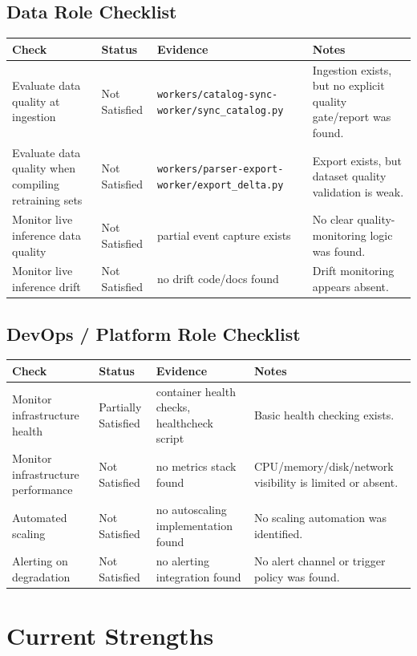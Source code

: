 \documentclass[11pt,a4paper]{article}
\begin{document}
\subsection{Data Role Checklist}

\begin{tabularx}{\textwidth}{P{4.2cm}P{2.4cm}P{3.8cm}Y}
\toprule
\textbf{Check} & \textbf{Status} & \textbf{Evidence} & \textbf{Notes} \\
\midrule
Evaluate data quality at ingestion & Not Satisfied & \texttt{workers/catalog-sync-worker/sync\_catalog.py} & Ingestion exists, but no explicit quality gate/report was found. \\
Evaluate data quality when compiling retraining sets & Not Satisfied & \texttt{workers/parser-export-worker/export\_delta.py} & Export exists, but dataset quality validation is weak. \\
Monitor live inference data quality & Not Satisfied & partial event capture exists & No clear quality-monitoring logic was found. \\
Monitor live inference drift & Not Satisfied & no drift code/docs found & Drift monitoring appears absent. \\
\bottomrule
\end{tabularx}

\subsection{DevOps / Platform Role Checklist}

\begin{tabularx}{\textwidth}{P{4.2cm}P{2.4cm}P{3.8cm}Y}
\toprule
\textbf{Check} & \textbf{Status} & \textbf{Evidence} & \textbf{Notes} \\
\midrule
Monitor infrastructure health & Partially Satisfied & container health checks, healthcheck script & Basic health checking exists. \\
Monitor infrastructure performance & Not Satisfied & no metrics stack found & CPU/memory/disk/network visibility is limited or absent. \\
Automated scaling & Not Satisfied & no autoscaling implementation found & No scaling automation was identified. \\
Alerting on degradation & Not Satisfied & no alerting integration found & No alert channel or trigger policy was found. \\
\bottomrule
\end{tabularx}

\section{Current Strengths}
\end{document}
